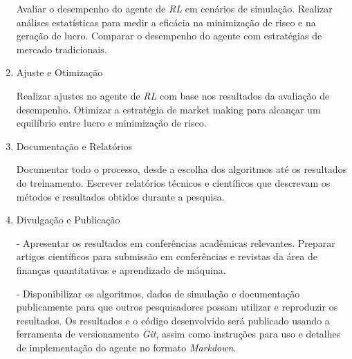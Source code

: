 \begin{enumerate}
Avaliar o desempenho do agente de \textit{RL} em cenários de simulação.
Realizar análises estatísticas para medir a eficácia na minimização de risco e na geração de lucro.
Comparar o desempenho do agente com estratégias de mercado tradicionais.

\item Ajuste e Otimização \label{item:adjustments}

Realizar ajustes no agente de \textit{RL} com base nos resultados da avaliação de desempenho. Otimizar a estratégia de market making para alcançar um equilíbrio entre lucro e minimização de risco.

\item Documentação e Relatórios \label{item:reports}

Documentar todo o processo, desde a escolha dos algoritmos até os resultados do treinamento. Escrever relatórios técnicos e científicos que descrevam os métodos e resultados obtidos durante a pesquisa.

\item Divulgação e Publicação \label{item:publishing}

- Apresentar os resultados em conferências acadêmicas relevantes. Preparar artigos científicos para submissão em conferências e revistas da área de finanças quantitativas e aprendizado de máquina.

- Disponibilizar os algoritmos, dados de simulação e documentação publicamente para que outros pesquisadores possam utilizar e reproduzir os resultados. Os resultados e o código desenvolvido será publicado usando a ferramenta de versionamento \textit{Git}, assim como instruções para uso e detalhes de implementação do agente no formato \textit{Markdown}.
\end{enumerate}
